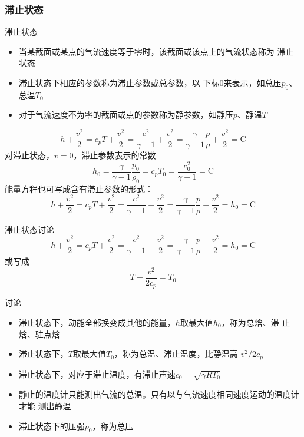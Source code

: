 \subsubsection{滞止状态}
\begin{frame}{滞止状态}
\begin{itemize}
  \item 当某截面或某点的气流速度等于零时，该截面或该点上的气流状态称为
    {\color{blue}滞止状态}
  \item 滞止状态下相应的参数称为{\color{blue}滞止参数}或{\color{blue}总参数}，以
    下标0来表示，如总压$p_{0}$、总温$T_{0}$
  \item 对于气流速度不为零的截面或点的参数称为静参数，如静压$p$、静温$T$
\end{itemize}  
\begin{equation*}
h
+
\frac{v^{2}}{2}
=
c_{p}T
+
\frac{v^{2}}{2}
=
\frac{c^{2}}{\gamma-1}
+
\frac{v^{2}}{2}
=
  \frac{\gamma}{\gamma-1}
  \frac{p}{\rho}
+
\frac{v^{2}}{2}
=
\mathrm{C}
\end{equation*}
对滞止状态，$v=0$，滞止参数表示的常数
\begin{equation*}
  h_{0}
  =
  \frac{\gamma}{\gamma-1}
  \frac{p_{0}}{\rho_{0}}
  =
  c_{p}T_{0}
  =
  \frac{c_{0}^{2}}{\gamma-1}
  =
  \mathrm{C}
\end{equation*}
能量方程也可写成含有滞止参数的形式：
\begin{equation*}
h
+
\frac{v^{2}}{2}
=
c_{p}T
+
\frac{v^{2}}{2}
=
\frac{c^{2}}{\gamma-1}
+
\frac{v^{2}}{2}
=
  \frac{\gamma}{\gamma-1}
  \frac{p}{\rho}
+
\frac{v^{2}}{2}
=
h_{0}
=
\mathrm{C}
\end{equation*}
\end{frame}

\begin{frame}{滞止状态讨论}
  \vspace*{-1.5em}
\begin{equation*}
h
+
\frac{v^{2}}{2}
=
c_{p}T
+
\frac{v^{2}}{2}
=
\frac{c^{2}}{\gamma-1}
+
\frac{v^{2}}{2}
=
  \frac{\gamma}{\gamma-1}
  \frac{p}{\rho}
+
\frac{v^{2}}{2}
=
h_{0}
=
\mathrm{C}
\end{equation*}
或写成
\begin{equation*}
T
+
\frac{v^{2}}{2c_{p}}
=
T_{0}
\end{equation*}
\vspace*{-1.5em}
\begin{block}{讨论}
 \begin{itemize}
  \item 滞止状态下，动能全部换变成其他的能量，$h$取最大值$h_{0}$，称为总焓、滞
    止焓、驻点焓
  \item 滞止状态下，$T$取最大值$T_{0}$，称为总温、滞止温度，比静温高
    $v^{2}/2c_{p}$
  \item 滞止状态下，对应于滞止温度，有滞止声速$c_{0}=\sqrt{\gamma RT_{0}}$
  \item 静止的温度计只能测出气流的总温。只有以与气流速度相同速度运动的温度计才能
    测出静温
  \item 滞止状态下的压强$p_{0}$，称为总压
\end{itemize} 
\end{block}
\end{frame}

